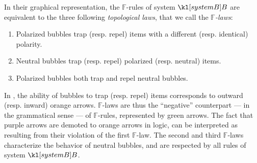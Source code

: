 \begin{description}
  In their graphical representation, the  $\mathbb{F}$-rules of
  system $\sysB$ are equivalent to the three following \emph{topological laws},
  that we call the \emph{$\mathbb{F}$-laws}:
  \begin{fact}
    \sbr
    \begin{enumerate}
      \item Polarized bubbles trap (resp. repel) items with a different (resp.
      identical) polarity.
      \item Neutral bubbles trap (resp. repel) polarized (resp. neutral) items.
      \item Polarized bubbles both trap and repel neutral bubbles.
    \end{enumerate}
  \end{fact}
  In , the ability of bubbles to trap (resp. repel)
  items corresponds to outward (resp. inward) orange arrows. $\mathbb{F}$-laws
  are thus the ``negative'' counterpart --- in the grammatical sense --- of
  $\mathbb{F}$-rules, represented by green arrows. The fact that purple arrows
  are demoted to orange arrows in  logic, can be interpreted as
  resulting from their violation of the first $\mathbb{F}$-law. The second and
  third $\mathbb{F}$-laws characterize the behavior of neutral bubbles, and are
  respected by all rules of system $\sysB$.
  

\end{description}
